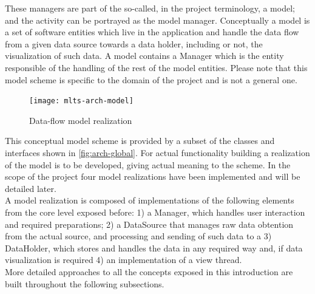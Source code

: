 
		These managers are part of the so-called, in the project terminology, a model; and the activity can be portrayed as the model manager. Conceptually a model is a set of software entities which live in the application and handle the data flow from a given data source towards a data holder, including or not, the visualization of such data. A model contains a Manager which is the entity responsible of the handling of the rest of the model entities. Please note that this model scheme is  specific to the domain of the project and is not a general one.

		\begin{figure}[h]
		\texttt{[image: mlts-arch-model]}
		\centering
		\caption{Data-flow model realization}
		\label{fig:arch-model}
		\end{figure}

		This conceptual model scheme is provided by a subset of the classes and interfaces shown in \autoref{fig:arch-global}. For actual functionality building a realization of the model is to be developed, giving actual meaning to the scheme. In the scope of the project four model realizations have been implemented and will be detailed later.\\

		A model realization is composed of implementations of the following elements from the core level exposed before: 1) a Manager, which handles user interaction and required preparations; 2) a DataSource that manages raw data obtention from the actual source, and processing and sending of such data to a 3) DataHolder, which stores and handles the data in any required way and, if data visualization is required 4) an implementation of a view thread.\\

		More detailed approaches to all the concepts exposed in this introduction are built throughout the following subsections.

